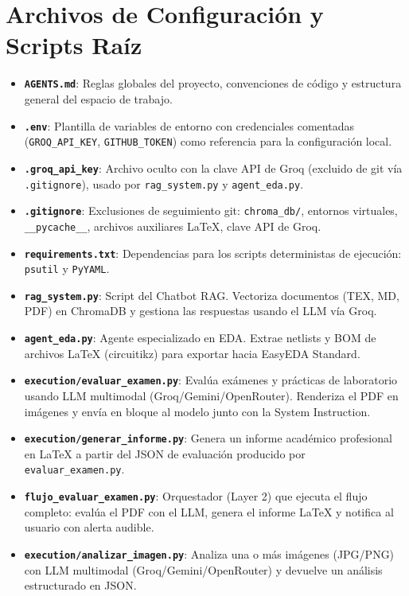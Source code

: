 \documentclass[12pt,a4paper]{article}
\begin{document}
\section{Archivos de Configuración y Scripts Raíz}
\begin{itemize}
    \item \textbf{\texttt{AGENTS.md}}: Reglas globales del proyecto, convenciones de código y estructura general del espacio de trabajo.
    \item \textbf{\texttt{.env}}: Plantilla de variables de entorno con credenciales comentadas (\texttt{GROQ\_API\_KEY}, \texttt{GITHUB\_TOKEN}) como referencia para la configuración local.
    \item \textbf{\texttt{.groq\_api\_key}}: Archivo oculto con la clave API de Groq (excluido de git vía \texttt{.gitignore}), usado por \texttt{rag\_system.py} y \texttt{agent\_eda.py}.
    \item \textbf{\texttt{.gitignore}}: Exclusiones de seguimiento git: \texttt{chroma\_db/}, entornos virtuales, \texttt{\_\_pycache\_\_}, archivos auxiliares LaTeX, clave API de Groq.
    \item \textbf{\texttt{requirements.txt}}: Dependencias para los scripts deterministas de ejecución: \texttt{psutil} y \texttt{PyYAML}.
    \item \textbf{\texttt{rag\_system.py}}: Script del Chatbot RAG. Vectoriza documentos (TEX, MD, PDF) en ChromaDB y gestiona las respuestas usando el LLM vía Groq.
    \item \textbf{\texttt{agent\_eda.py}}: Agente especializado en EDA. Extrae netlists y BOM de archivos LaTeX (circuitikz) para exportar hacia EasyEDA Standard.
    \item \textbf{\texttt{execution/evaluar\_examen.py}}: Evalúa exámenes y prácticas de laboratorio usando LLM multimodal (Groq/Gemini/OpenRouter). Renderiza el PDF en imágenes y envía en bloque al modelo junto con la System Instruction.
    \item \textbf{\texttt{execution/generar\_informe.py}}: Genera un informe académico profesional en LaTeX a partir del JSON de evaluación producido por \texttt{evaluar\_examen.py}.
    \item \textbf{\texttt{flujo\_evaluar\_examen.py}}: Orquestador (Layer 2) que ejecuta el flujo completo: evalúa el PDF con el LLM, genera el informe LaTeX y notifica al usuario con alerta audible.
    \item \textbf{\texttt{execution/analizar\_imagen.py}}: Analiza una o más imágenes (JPG/PNG) con LLM multimodal (Groq/Gemini/OpenRouter) y devuelve un análisis estructurado en JSON.

\end{itemize}
\end{document}
